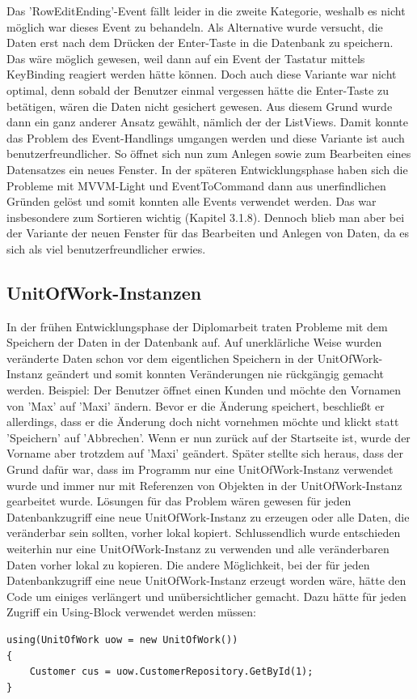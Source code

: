 Das 'RowEditEnding'-Event fällt leider in die zweite Kategorie, weshalb es nicht möglich war dieses Event zu behandeln. Als Alternative wurde versucht, die Daten erst nach dem Drücken der Enter-Taste in die Datenbank zu speichern. Das wäre möglich gewesen, weil dann auf ein Event der Tastatur mittels KeyBinding reagiert werden hätte können. Doch auch diese Variante war nicht optimal, denn sobald der Benutzer einmal vergessen hätte die Enter-Taste zu betätigen, wären die Daten nicht gesichert gewesen. Aus diesem Grund wurde dann ein ganz anderer Ansatz gewählt, nämlich der der ListViews. Damit konnte das Problem des Event-Handlings umgangen werden und diese Variante ist auch benutzerfreundlicher. So öffnet sich nun zum Anlegen sowie zum Bearbeiten eines Datensatzes ein neues Fenster. \newline In der späteren Entwicklungsphase haben sich die Probleme mit MVVM-Light und EventToCommand dann aus unerfindlichen Gründen gelöst und somit konnten alle Events verwendet werden. Das war insbesondere zum Sortieren wichtig (Kapitel 3.1.8). Dennoch blieb man aber bei der Variante der neuen Fenster für das Bearbeiten und Anlegen von Daten, da es sich als viel benutzerfreundlicher erwies.
\subsection{UnitOfWork-Instanzen}
In der frühen Entwicklungsphase der Diplomarbeit traten Probleme mit dem Speichern der Daten in der Datenbank auf. Auf unerklärliche Weise wurden veränderte Daten schon vor dem eigentlichen Speichern in der UnitOfWork-Instanz geändert und somit konnten Veränderungen nie rückgängig gemacht werden. \newline Beispiel: Der Benutzer öffnet einen Kunden und möchte den Vornamen von 'Max' auf 'Maxi' ändern. Bevor er die Änderung speichert, beschließt er allerdings, dass er die Änderung doch nicht vornehmen möchte und klickt statt 'Speichern' auf 'Abbrechen'. Wenn er nun zurück auf der Startseite ist, wurde der Vorname aber trotzdem auf 'Maxi' geändert. \newline Später stellte sich heraus, dass der Grund dafür war, dass im Programm nur eine UnitOfWork-Instanz verwendet wurde und immer nur mit Referenzen von Objekten in der UnitOfWork-Instanz gearbeitet wurde. Lösungen für das Problem wären gewesen für jeden Datenbankzugriff eine neue UnitOfWork-Instanz zu erzeugen oder alle Daten, die veränderbar sein sollten, vorher lokal kopiert. Schlussendlich wurde entschieden weiterhin nur eine UnitOfWork-Instanz zu verwenden und alle veränderbaren Daten vorher lokal zu kopieren. Die andere Möglichkeit, bei der für jeden Datenbankzugriff eine neue UnitOfWork-Instanz erzeugt worden wäre, hätte den Code um einiges verlängert und unübersichtlicher gemacht. Dazu hätte für jeden Zugriff ein Using-Block verwendet werden müssen:  
\begin{lstlisting}
using(UnitOfWork uow = new UnitOfWork())
{
	Customer cus = uow.CustomerRepository.GetById(1);
}
\end{lstlisting}